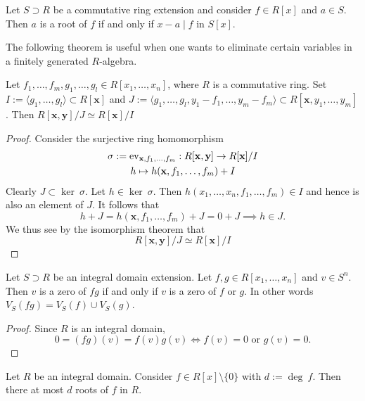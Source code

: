 \begin{corollary}\label{RootIffMinimalPolynomialDivides}
    Let $S\supset R$ be a commutative ring extension and consider $f\in R[x]$ and $a \in S$. Then $a$ is a root of $f$ if and only if $x-a\mid f$ in $S[x]$. 
\end{corollary}
The following theorem is useful when one wants to eliminate certain variables in a finitely generated $R$-algebra.  
\begin{corollary}\label{EliminationOfVoidVariablesInFinitelyGeneratedAlgebra}
    Let $f_1,\dots,f_m,g_1,\dots,g_l\in R[x_1,\dots,x_n]$, where $R$ is a commutative ring. Set $I:=\langle g_1,\dots,g_l\rangle \subset R[\mathbf{x}]$ and $J:= \langle g_1,\dots,g_l,y_1-f_1,\dots,y_m-f_m\rangle\subset R[\mathbf{x},y_1,\dots,y_m]$. Then $R[\mathbf{x},\mathbf{y}]/J \simeq R[\mathbf{x}]/I$ 
\end{corollary}
\begin{proof}
    Consider the surjective ring homomorphism
    \begin{gather*}
        \sigma := \mathrm{ev}_{\mathbf{x},f_1,\dots,f_m} : R[\mathbf{x},\mathbf{y}]\rightarrow R[\mathbf{x}]/I\\
        h \mapsto h(\mathbf{x},f_1,\dots,f_m) + I 
    \end{gather*}
    Clearly $J\subset \ker \ \sigma$. Let $h \in \ker\ \sigma$. Then $h(x_1,\dots,x_n,f_1,\dots,f_m)\in I$ and hence is also an element of $J$. It follows that
    $$h + J = h(\mathbf{x},f_1,\dots,f_m) + J = 0 + J\implies h\in J.$$
    We thus see by the isomorphism theorem that 
    $$R[\mathbf{x},\mathbf{y}]/J \simeq R[\mathbf{x}]/I$$
\end{proof}
\begin{lemma}\label{RootsProductIsUnionOfRootsOfFactors}
    Let $S\supset R$ be an integral domain extension. Let $f,g\in R[x_1,\dots,x_n]$ and $v\in S^n$. Then $v$ is a zero of $fg$ if and only if $v$ is a zero of $f$ or $g$. In other words $V_S(fg)=V_S(f)\cup V_S(g)$.
\end{lemma}
\begin{proof}
    Since $R$ is an integral domain,
    $$0 = (fg)(v) = f(v)g(v) \iff f(v) = 0 \text{ or } g(v) = 0.$$
\end{proof}
\begin{proposition}\label{InIDNumberOfRootsBoundedByDegree}
    Let $R$ be an integral domain. Consider $f \in R[x]\setminus\{0\}$ with $d := \deg \ f$. Then there at most $d$ roots of $f$ in $R$.  
\end{proposition}
